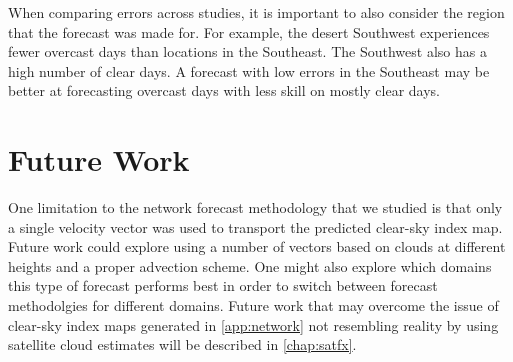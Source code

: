When comparing errors across studies, it is important to also consider
the region that the forecast was made for.
For example, the desert Southwest experiences fewer overcast days than
locations in the Southeast.
The Southwest also has a high number of clear days.
A forecast with low errors in the Southeast may be better at
forecasting overcast days with less skill on mostly clear days.

\section{Future Work}
One limitation to the network forecast methodology that we studied is
that only a single velocity vector was used to transport the predicted
clear-sky index map.
Future work could explore using a number of vectors based on clouds at
different heights and a proper advection scheme.
One might also explore which domains this type of forecast performs
best in order to switch between forecast methodolgies for different
domains.
Future work that may overcome the issue of clear-sky index maps
generated in \cref{app:network} not resembling reality by using
satellite cloud estimates will be described in \cref{chap:satfx}.


